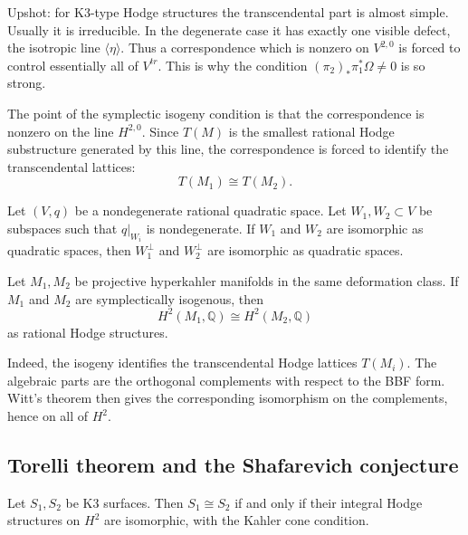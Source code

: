 \medskip
Upshot: for K3-type Hodge structures the
transcendental part is almost simple.
Usually it is irreducible.
In the degenerate case it has exactly one
visible defect, the isotropic line
$\langle\eta\rangle$.
Thus a correspondence which is nonzero on
$V^{2,0}$ is forced to control essentially
all of $V^{tr}$.
This is why the condition
$(\pi_2)_*\pi_1^*\Omega\neq 0$ is so strong.

\begin{lemma}
\label{lemma-sympl-isog-controls-tm}
The point of the symplectic isogeny
condition is that the correspondence is
nonzero on the line $H^{2,0}$.
Since $T(M)$ is the smallest rational Hodge
substructure generated by this line, the
correspondence is forced to identify the
transcendental lattices:
$$
T(M_1)\cong T(M_2).
$$
\end{lemma}

\begin{theorem}[Witt]
\label{theorem-witt-quadratic-spaces}
Let $(V,q)$ be a nondegenerate rational
quadratic space.
Let $W_1,W_2\subset V$ be subspaces such that
$q|_{W_i}$ is nondegenerate.
If $W_1$ and $W_2$ are isomorphic as
quadratic spaces, then
$W_1^\perp$ and $W_2^\perp$ are isomorphic
as quadratic spaces.
\end{theorem}

\begin{lemma}
\label{lemma-isogeny-gives-h2-hodge-isom}
Let $M_1,M_2$ be projective hyperkahler
manifolds in the same deformation class.
If $M_1$ and $M_2$ are symplectically
isogenous, then
$$
H^2(M_1,\mathbb{Q})\cong
H^2(M_2,\mathbb{Q})
$$
as rational Hodge structures.
\end{lemma}

\noindent
Indeed, the isogeny identifies the
transcendental Hodge lattices $T(M_i)$.
The algebraic parts are the orthogonal
complements with respect to the BBF form.
Witt's theorem then gives the corresponding
isomorphism on the complements, hence on all
of $H^2$.

\subsection{Torelli theorem and the
Shafarevich
conjecture}
\label{subsection-torelli-shafarevich}

\begin{theorem}
\label{theorem-torelli-k3}
Let $S_1,S_2$ be K3 surfaces.
Then $S_1\cong S_2$ if and only if their
integral Hodge structures on $H^2$ are
isomorphic, with the Kahler cone condition.
\end{theorem}

